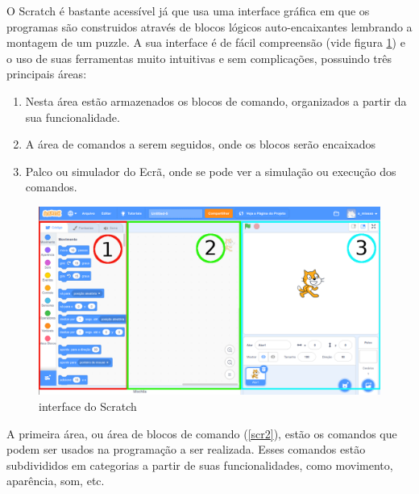 \documentclass[12pt, openright, a4paper, brazil, openany, oneside]{abntex2}
\begin{document}
 O Scratch é bastante acessível já que usa uma interface gráfica em que os programas são construidos através de blocos lógicos auto-encaixantes lembrando a montagem de um puzzle. A sua interface é de fácil compreensão (vide figura \ref{scr1}) e o uso de suas ferramentas muito intuitivas e sem complicações, possuindo três principais áreas:
 
\begin{enumerate}
\item Nesta área estão armazenados os blocos de comando, organizados a partir da sua funcionalidade.
\item A área de comandos a serem seguidos, onde os blocos serão encaixados
\item Palco ou simulador do Ecrã, onde se pode ver a simulação ou execução dos comandos.
\end{enumerate}

\begin{figure}[h]

    \center

    \includegraphics[width=15cm]{scratch1.png}
    \caption{interface do Scratch \label{scr1}}
    
\end{figure}

\newpage

A primeira área, ou área de blocos de comando (\ref{scr2}), estão os comandos que podem ser usados na programação a ser realizada. Esses comandos estão subdivididos em categorias a partir de suas funcionalidades, como movimento, aparência, som, etc.
\end{document}

